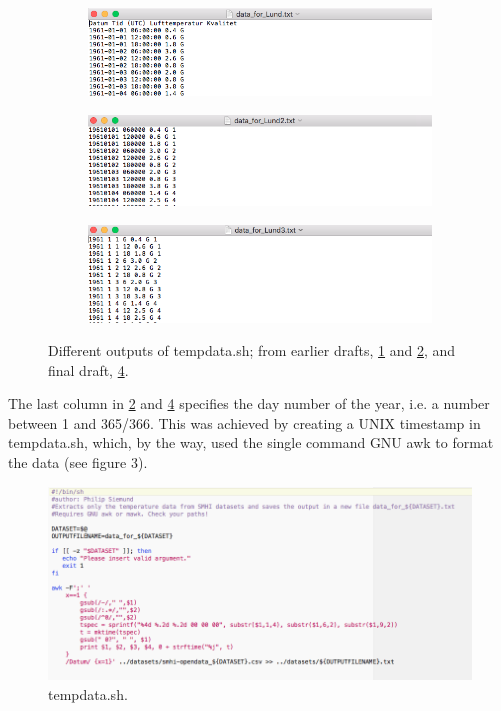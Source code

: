 \documentclass{article}
\begin{document}
\begin{figure}[H]
\centering
\begin{subfigure}[h]{1\textwidth}
\centering
\includegraphics[width=\textwidth]{Lund1} 
\caption{} \label{figa}
\end{subfigure}

\begin{subfigure}[h]{1\textwidth}
\centering
\includegraphics[width=\textwidth]{Lund2} 
\caption{} \label{figb}
\end{subfigure}


\begin{subfigure}[h]{1\textwidth}
\centering
\includegraphics[width=\textwidth]{Lund3} 
\caption{} \label{figc}
\end{subfigure}

\caption{Different outputs of tempdata.sh; from earlier drafts, \ref{figa} and \ref{figb}, and final draft, \ref{figc}.}
\end{figure}
The last column in \ref{figb} and \ref{figc} specifies the day number of the year, i.e. a number between 1 and 365/366. This was achieved by creating a UNIX timestamp in tempdata.sh, which, by the way, used the single command GNU awk to format the data (see figure 3). 

\begin{figure}[H]
\centering
\includegraphics[scale=0.4]{Codetemp.png}
\caption{tempdata.sh.}
\end{figure}
\end{document}
